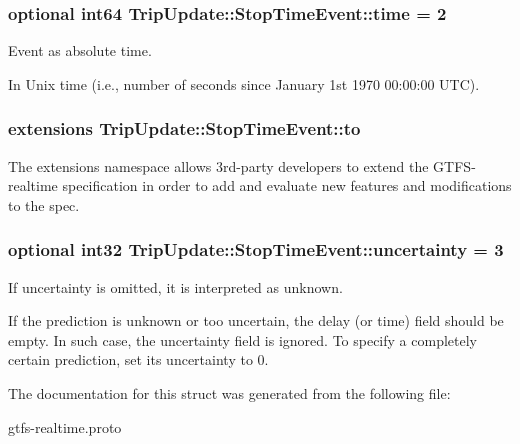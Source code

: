 \subsubsection[{\texorpdfstring{time}{time}}]{\setlength{\rightskip}{0pt plus 5cm}optional int64 Trip\+Update\+::\+Stop\+Time\+Event\+::time = 2}\hypertarget{structTripUpdate_1_1StopTimeEvent_ad4b60263cd802942cfe9ecb5575a43e1}{}\label{structTripUpdate_1_1StopTimeEvent_ad4b60263cd802942cfe9ecb5575a43e1}


Event as absolute time. 

In Unix time (i.\+e., number of seconds since January 1st 1970 00\+:00\+:00 U\+TC). 
\subsubsection[{\texorpdfstring{to}{to}}]{\setlength{\rightskip}{0pt plus 5cm}extensions Trip\+Update\+::\+Stop\+Time\+Event\+::to}\hypertarget{structTripUpdate_1_1StopTimeEvent_a8ec3aa808c676e498daef61b967f7dd3}{}\label{structTripUpdate_1_1StopTimeEvent_a8ec3aa808c676e498daef61b967f7dd3}


The extensions namespace allows 3rd-\/party developers to extend the G\+T\+F\+S-\/realtime specification in order to add and evaluate new features and modifications to the spec. 

\subsubsection[{\texorpdfstring{uncertainty}{uncertainty}}]{\setlength{\rightskip}{0pt plus 5cm}optional int32 Trip\+Update\+::\+Stop\+Time\+Event\+::uncertainty = 3}\hypertarget{structTripUpdate_1_1StopTimeEvent_aa5a428ea725519680c1b1b1b23d7c454}{}\label{structTripUpdate_1_1StopTimeEvent_aa5a428ea725519680c1b1b1b23d7c454}


If uncertainty is omitted, it is interpreted as unknown. 

If the prediction is unknown or too uncertain, the delay (or time) field should be empty. In such case, the uncertainty field is ignored. To specify a completely certain prediction, set its uncertainty to 0. 

The documentation for this struct was generated from the following file\+:\begin{DoxyCompactItemize}
\item 
gtfs-\/realtime.\+proto\end{DoxyCompactItemize}
